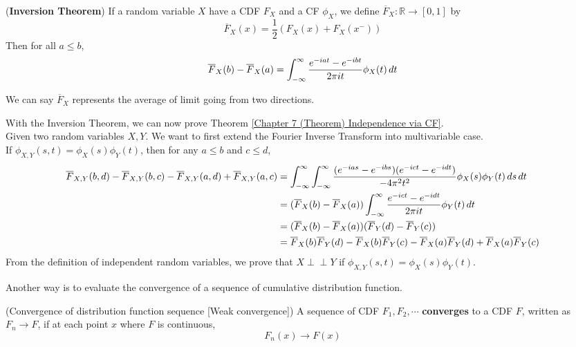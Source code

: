 \documentclass{huhtakm-template-book}
\newcommand{\independent}{\perp\!\!\!\perp}
\begin{document}
\begin{thm}(\textbf{Inversion Theorem})
	If a random variable $X$ have a CDF $F_{X}$ and a CF $\phi_{X}$, we define $\overline{F}_{X}:\mathbb{R}\to[0,1]$ by
	\begin{equation*}
		\overline{F}_{X}(x)=\frac{1}{2}\left(F_{X}(x)+F_{X}(x^{-})\right)
	\end{equation*}
	Then for all $a\leq b$,
	\begin{equation*}
		\overline{F}_{X}(b)-\overline{F}_{X}(a)=\int_{-\infty}^{\infty}\frac{e^{-iat}-e^{-ibt}}{2\pi it}\phi_{X}(t)\,dt
	\end{equation*}
\end{thm}
\begin{rem}
	We can say $\overline{F}_{X}$ represents the average of limit going from two directions.
\end{rem}
\begin{eg}
	\label{Chapter 7 (Example) Proof of Independence via CF}
	With the Inversion Theorem, we can now prove Theorem \ref{Chapter 7 (Theorem) Independence via CF}.\\
	Given two random variables $X,Y$. We want to first extend the Fourier Inverse Transform into multivariable case.\\
	If $\phi_{X,Y}(s,t)=\phi_{X}(s)\phi_{Y}(t)$, then for any $a\leq b$ and $c\leq d$,
	\begin{align*}
		\overline{F}_{X,Y}(b,d)-\overline{F}_{X,Y}(b,c)-\overline{F}_{X,Y}(a,d)+\overline{F}_{X,Y}(a,c)&=\int_{-\infty}^{\infty}\int_{-\infty}^{\infty}\frac{(e^{-ias}-e^{-ibs})(e^{-ict}-e^{-idt})}{-4\pi^{2}t^{2}}\phi_{X}(s)\phi_{Y}(t)\,ds\,dt\\
		&=(\overline{F}_{X}(b)-\overline{F}_{X}(a))\int_{-\infty}^{\infty}\frac{e^{-ict}-e^{-idt}}{2\pi it}\phi_{Y}(t)\,dt\\
		&=(\overline{F}_{X}(b)-\overline{F}_{X}(a))(\overline{F}_{Y}(d)-\overline{F}_{Y}(c))\\
		&=\overline{F}_{X}(b)\overline{F}_{Y}(d)-\overline{F}_{X}(b)\overline{F}_{Y}(c)-\overline{F}_{X}(a)\overline{F}_{Y}(d)+\overline{F}_{X}(a)\overline{F}_{Y}(c)
	\end{align*}
	From the definition of independent random variables, we prove that $X\independent Y$ if $\phi_{X,Y}(s,t)=\phi_{X}(s)\phi_{Y}(t)$.
\end{eg}
\newpage
Another way is to evaluate the convergence of a sequence of cumulative distribution function.
\begin{defn}(Convergence of distribution function sequence [Weak convergence])
	A sequence of CDF 
	$F_{1},F_{2},\cdots$ \textbf{converges} to a CDF $F$, written as $F_{n}\to F$, if at each point $x$ where $F$ is continuous,
	\begin{equation*}
		F_{n}(x)\to F(x)
	\end{equation*}
\end{defn}
\end{document}

